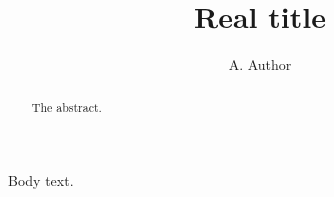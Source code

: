 \documentclass[fleqn,twoside]{article}
\title{Real title}
\author{A. Author\address{Somewhere}}
\begin{document}
\begin{abstract}The abstract.\end{abstract}
\maketitle
Body text.
\end{document}
